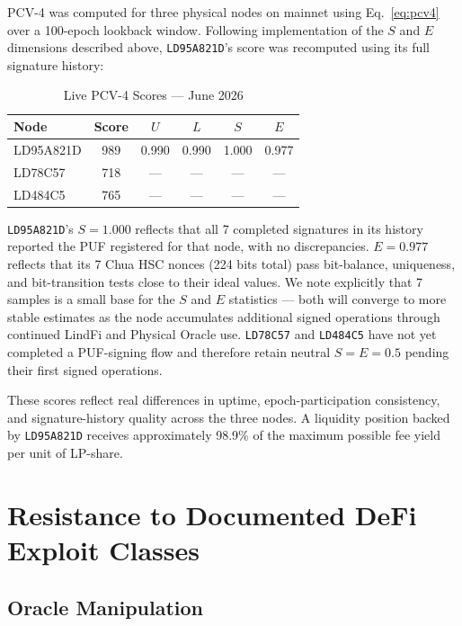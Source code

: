 \documentclass[11pt,a4paper]{article}
\begin{document}
PCV-4 was computed for three physical nodes on mainnet using Eq.~\eqref{eq:pcv4} over a 100-epoch lookback window. Following implementation of the $S$ and $E$ dimensions described above, \texttt{LD95A821D}'s score was recomputed using its full signature history:

\begin{table}[H]
\centering
\caption{Live PCV-4 Scores --- June 2026}
\label{tab:pcv4_live}
\begin{tabular}{@{}lccccc@{}}
\toprule
\textbf{Node} & \textbf{Score} & $U$ & $L$ & $S$ & $E$ \\
\midrule
LD95A821D & 989 & 0.990 & 0.990 & 1.000 & 0.977 \\
LD78C57   & 718 & --- & --- & --- & --- \\
LD484C5   & 765 & --- & --- & --- & --- \\
\bottomrule
\end{tabular}
\end{table}

\texttt{LD95A821D}'s $S=1.000$ reflects that all 7 completed signatures in its history reported the PUF registered for that node, with no discrepancies. $E=0.977$ reflects that its 7 Chua HSC nonces (224 bits total) pass bit-balance, uniqueness, and bit-transition tests close to their ideal values. We note explicitly that 7 samples is a small base for the $S$ and $E$ statistics --- both will converge to more stable estimates as the node accumulates additional signed operations through continued LindFi and Physical Oracle use. \texttt{LD78C57} and \texttt{LD484C5} have not yet completed a PUF-signing flow and therefore retain neutral $S=E=0.5$ pending their first signed operations.

These scores reflect real differences in uptime, epoch-participation consistency, and signature-history quality across the three nodes. A liquidity position backed by \texttt{LD95A821D} receives approximately 98.9\% of the maximum possible fee yield per unit of LP-share.

\section{Resistance to Documented DeFi Exploit Classes}

\subsection{Oracle Manipulation}
\end{document}
